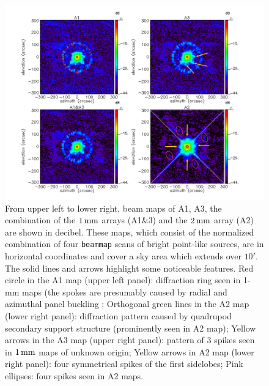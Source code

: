 \begin{figure}[!thbp]
\begin{center}
  \includegraphics[trim=0.5cm 0.5cm 1cm 0cm, clip=true, width=\linewidth]{Figures/Beams_features.pdf}
\caption[Noticeable features of NIKA2 beam pattern.]{From upper left
  to lower right, beam maps of A1, A3,
  the combination of the $1\,\rm{mm}$ arrays (A1$\&$3) and the
  $2\,\rm{mm}$ array (A2) are shown in decibel. These maps, which
  consist of the normalized combination of four {\tt beammap} scans of
  bright point-like sources, are in horizontal coordinates and cover a
  sky area which extends over $10'$. %
  The solid lines and arrows highlight some noticeable features.
  Red circle in the A1 map (upper left panel): diffraction ring seen in 1-mm maps
  (the spokes are presumably caused by radial and azimuthal panel
  buckling \citep{Greve2010}; Orthogonal green lines in the A2 map
  (lower right panel): diffraction
  pattern caused by quadrupod secondary support structure (prominently
  seen in A2 map); Yellow arrows in the A3 map (upper right panel):
  pattern of 3 spikes seen in $1\,\rm{mm}$ maps of unknown origin; Yellow
  arrows in A2 map (lower right panel): four symmetrical spikes of the
  first sidelobes; Pink ellipses: four spikes seen in A2 maps.}
\label{fig:features}
\end{center}
\end{figure}

